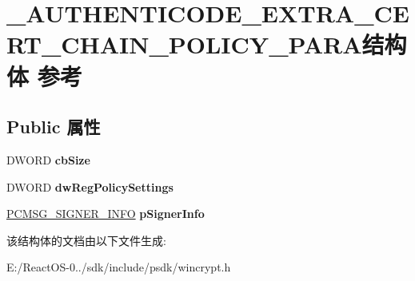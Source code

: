\hypertarget{struct___a_u_t_h_e_n_t_i_c_o_d_e___e_x_t_r_a___c_e_r_t___c_h_a_i_n___p_o_l_i_c_y___p_a_r_a}{}\section{\+\_\+\+A\+U\+T\+H\+E\+N\+T\+I\+C\+O\+D\+E\+\_\+\+E\+X\+T\+R\+A\+\_\+\+C\+E\+R\+T\+\_\+\+C\+H\+A\+I\+N\+\_\+\+P\+O\+L\+I\+C\+Y\+\_\+\+P\+A\+R\+A结构体 参考}
\label{struct___a_u_t_h_e_n_t_i_c_o_d_e___e_x_t_r_a___c_e_r_t___c_h_a_i_n___p_o_l_i_c_y___p_a_r_a}
\subsection*{Public 属性}
\begin{DoxyCompactItemize}
\item 
\mbox{\label{struct___a_u_t_h_e_n_t_i_c_o_d_e___e_x_t_r_a___c_e_r_t___c_h_a_i_n___p_o_l_i_c_y___p_a_r_a_a561ea151798962cff3f92f955b5dc368}} 
D\+W\+O\+RD {\bfseries cb\+Size}
\item 
\mbox{\label{struct___a_u_t_h_e_n_t_i_c_o_d_e___e_x_t_r_a___c_e_r_t___c_h_a_i_n___p_o_l_i_c_y___p_a_r_a_a7b6cd58f6b646ede141085288204ad5e}} 
D\+W\+O\+RD {\bfseries dw\+Reg\+Policy\+Settings}
\item 
\mbox{\label{struct___a_u_t_h_e_n_t_i_c_o_d_e___e_x_t_r_a___c_e_r_t___c_h_a_i_n___p_o_l_i_c_y___p_a_r_a_abd33e7dc32a5b797734c8087ef067d8d}} 
\hyperlink{struct___c_m_s_g___s_i_g_n_e_r___i_n_f_o}{P\+C\+M\+S\+G\+\_\+\+S\+I\+G\+N\+E\+R\+\_\+\+I\+N\+FO} {\bfseries p\+Signer\+Info}
\end{DoxyCompactItemize}


该结构体的文档由以下文件生成\+:\begin{DoxyCompactItemize}
\item 
E\+:/\+React\+O\+S-\/0../sdk/include/psdk/wincrypt.\+h\end{DoxyCompactItemize}
